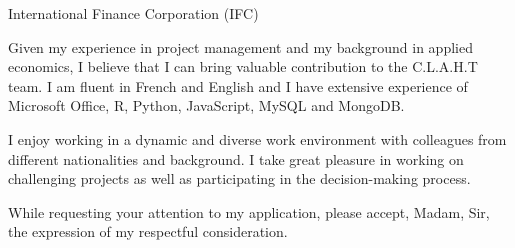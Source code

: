 \documentclass[12pt]{lettre}
\begin{document}
\begin{letter}{
International Finance Corporation (IFC)
}
\begin{spacing}{1.5}
Given my experience in project management and my background in applied economics, I believe that I can bring valuable contribution to the C.L.A.H.T team. I am fluent in French and English and I have extensive experience of Microsoft Office, R, Python, JavaScript, MySQL and MongoDB.

I enjoy working in a dynamic and diverse work environment with colleagues from different nationalities and background. I take great pleasure in working on challenging projects as well as  participating in the decision-making process.

\end{spacing}

\closing{
    While requesting your attention to my application, please 
    accept, Madam, Sir, the expression of my respectful 
    consideration.}
\end{letter}
\end{document}
